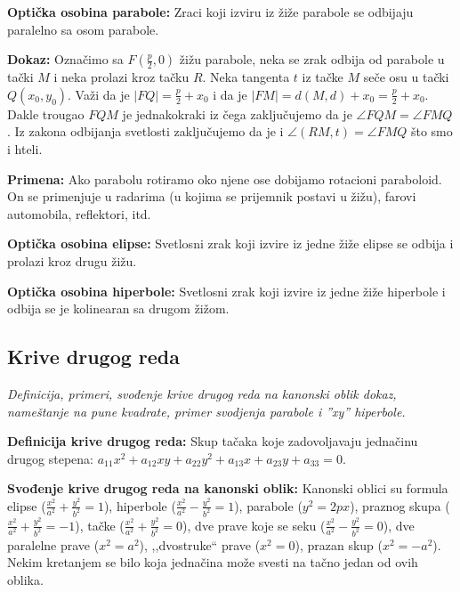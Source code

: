 \documentclass[12pt]{article}
\begin{document}
\textbf{Optička osobina parabole:} Zraci koji izviru iz žiže parabole se
odbijaju paralelno sa osom parabole.
\par

\textbf{Dokaz:} Označimo sa $F(\frac{p}{2},0)$ žižu parabole, neka se zrak
odbija od parabole u tački $M$ i neka prolazi kroz tačku $R$. Neka tangenta $t$
iz tačke $M$ seče osu u tački $Q(x_0,y_0)$. Važi da je $|FQ|=\frac{p}{2}+x_0$ i
da je $|FM|=d(M,d)+x_0=\frac{p}{2}+x_0$. Dakle trougao $FQM$ je jednakokraki
iz čega zaključujemo da je $\angle FQM=\angle FMQ$. Iz zakona odbijanja
svetlosti zaključujemo da je i $\angle(RM,t)=\angle FMQ$ što smo i hteli.
\par

\textbf{Primena:} Ako parabolu rotiramo oko njene ose dobijamo rotacioni
paraboloid. On se primenjuje u radarima (u kojima se prijemnik postavi u žižu),
farovi automobila, reflektori, itd.
\par

\textbf{Optička osobina elipse:} Svetlosni zrak koji izvire iz jedne žiže
elipse se odbija i prolazi kroz drugu žižu.
\par

\textbf{Optička osobina hiperbole:} Svetlosni zrak koji izvire iz jedne žiže
hiperbole i odbija se je kolinearan sa drugom žižom.

\subsection{Krive drugog reda}
\textit{Definicija, primeri, svođenje krive drugog reda na kanonski oblik
    dokaz, nameštanje na pune kvadrate, primer svodjenja parabole i ”xy”
    hiperbole.}
\par
\vspace*{1cm}

\textbf{Definicija krive drugog reda:} Skup tačaka koje zadovoljavaju jednačinu
drugog stepena: $a_{11}x^2+a_{12}xy+a_{22}y^2+a_{13}x+a_{23}y+a_{33}=0$.
\par

\textbf{Svođenje krive drugog reda na kanonski oblik:} Kanonski oblici su
formula elipse ($\frac{x^2}{a^2}+\frac{y^2}{b^2}=1$), hiperbole
($\frac{x^2}{a^2}-\frac{y^2}{b^2}=1$), parabole ($y^2=2px$), praznog skupa
($\frac{x^2}{a^2}+\frac{y^2}{b^2}=-1$), tačke
($\frac{x^2}{a^2}+\frac{y^2}{b^2}=0$), dve prave koje se seku
($\frac{x^2}{a^2}-\frac{y^2}{b^2}=0$), dve paralelne prave ($x^2=a^2$),
,,dvostruke`` prave ($x^2=0$), prazan skup ($x^2=-a^2$). Nekim kretanjem se
bilo koja jednačina može svesti na tačno jedan od ovih oblika.
\par
\end{document}

